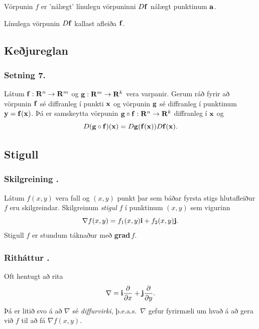 \bigskip
Vörpunin $f$ er 'nálægt' línulegu vörpuninni $D\mbox{${\bf f}$}$ nálægt punktinum $\mbox{${\bf a}$}$.

\bigskip
Línulega vörpunin $D\mbox{${\bf f}$}$ kallast afleiða $\mbox{${\bf f}$}$.



\subsection{Keðjureglan} 
 \subsubsection{Setning 7.}
Látum $\mbox{${\bf f}$}:\mbox{${\bf R}^n$}\rightarrow \mbox{${\bf R}^m$}$ og 
$\mbox{${\bf g}$}:\mbox{${\bf R}^m$}\rightarrow \mbox{${\bf R}^k$}$ vera varpanir.  Gerum ráð fyrir að vörpunin
$\mbox{${\bf f}$}$ sé diffranleg í punkti $\mbox{${\bf x}$}$ og vörpunin $\mbox{${\bf g}$}$ sé diffranleg í
punktinum $\mbox{${\bf y}$}=\mbox{${\bf f}$}(\mbox{${\bf x}$})$.  Þá er samskeytta vörpunin
$\mbox{${\bf g}$}\circ\mbox{${\bf f}$}:\mbox{${\bf R}^n$}\rightarrow\mbox{${\bf R}^k$}$ diffranleg í $\mbox{${\bf x}$}$ og 
$$D(\mbox{${\bf g}$}\circ\mbox{${\bf f}$})(\mbox{${\bf x}$})=D\mbox{${\bf g}$}(\mbox{${\bf f}$}(\mbox{${\bf x}$}))D\mbox{${\bf f}$}(\mbox{${\bf x}$}).$$





\subsection{Stigull} 

\subsubsection{Skilgreining \kaflanr.}

 Látum $f(x,y)$ vera fall og $(x,y)$ punkt þar
sem báðar fyrsta stigs hlutafleiður $f$ eru skilgreindar.  Skilgreinum
{\em stigul} $f$ í punktinum $(x,y)$ sem vigurinn 
$$\nabla f(x,y)=f_1(x,y)\mbox{${\bf i}$}+f_2(x,y)\mbox{${\bf j}$}.$$
Stigull $f$ er stundum táknaður með {\bf grad}$\,f$.



\subsubsection{Ritháttur \kaflanr.}
Oft hentugt að rita
$$\nabla=\mbox{${\bf i}$}\frac{\partial}{\partial x}+ \mbox{${\bf j}$}\frac{\partial}{\partial y}.$$
Þá er litið svo á að $\nabla$ sé {\em diffurvirki}, þ.e.a.s.\ $\nabla$
gefur fyrirmæli um hvað á að gera við $f$ til að fá $\nabla f(x,y)$.




